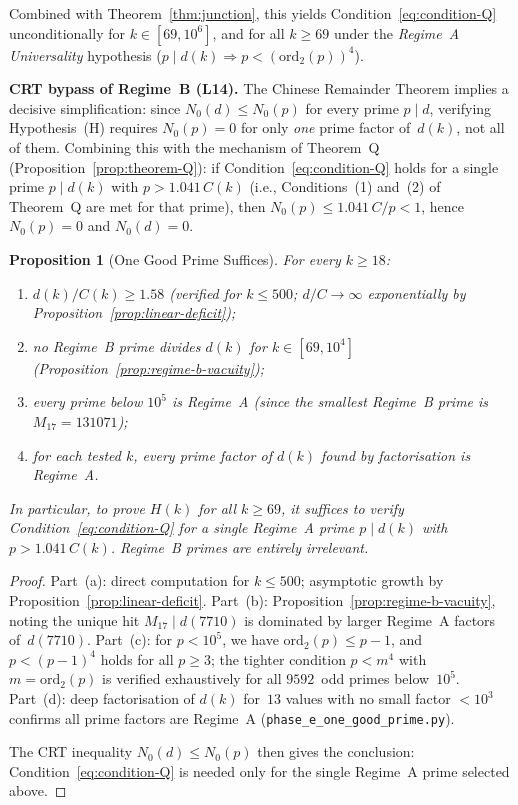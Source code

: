 \documentclass[12pt, a4paper]{amsart}
\theoremstyle{plain}
\newtheorem{proposition}[theorem]{Proposition}
\theoremstyle{definition}
\theoremstyle{remark}
\begin{document}
Combined with Theorem~\ref{thm:junction}, this yields
Condition~\eqref{eq:condition-Q} unconditionally for
$k \in [69, 10^6]$, and for all $k \geq 69$ under the
\emph{Regime~A Universality} hypothesis
($p \mid d(k) \Rightarrow p < (\mathrm{ord}_2(p))^4$).

\medskip\noindent
\textbf{CRT bypass of Regime~B (L14).}
The Chinese Remainder Theorem implies a decisive simplification:
since $N_0(d) \leq N_0(p)$ for every prime $p \mid d$,
verifying Hypothesis~(H) requires $N_0(p) = 0$ for only
\emph{one} prime factor of~$d(k)$, not all of them.
Combining this with the mechanism of Theorem~Q
(Proposition~\ref{prop:theorem-Q}):
if Condition~\eqref{eq:condition-Q} holds for a single prime
$p \mid d(k)$ with $p > 1.041\,C(k)$
(i.e., Conditions~(1) and~(2) of Theorem~Q are met
for that prime), then
$N_0(p) \leq 1.041\,C/p < 1$, hence $N_0(p) = 0$
and $N_0(d) = 0$.

\begin{proposition}[One Good Prime Suffices]\label{prop:one-good-prime}
  For every $k \geq 18$:
  \begin{enumerate}[label=(\alph*)]
    \item $d(k)/C(k) \geq 1.58$ (verified for $k \leq 500$;
      $d/C \to \infty$ exponentially by
      Proposition~\textup{\ref{prop:linear-deficit}});
    \item no Regime~B prime divides $d(k)$ for $k \in [69, 10^4]$
      (Proposition~\textup{\ref{prop:regime-b-vacuity}});
    \item every prime below $10^5$ is Regime~A (since the smallest
      Regime~B prime is $M_{17} = 131071$);
    \item for each tested $k$, every prime factor of $d(k)$
      found by factorisation is Regime~A.
  \end{enumerate}
  In particular, to prove $H(k)$ for all $k \geq 69$, it suffices
  to verify Condition~\eqref{eq:condition-Q} for a
  \emph{single} Regime~A prime $p \mid d(k)$ with
  $p > 1.041\,C(k)$.
  Regime~B primes are entirely irrelevant.
\end{proposition}

\begin{proof}
  Part~(a): direct computation for $k \leq 500$; asymptotic
  growth by Proposition~\ref{prop:linear-deficit}.
  Part~(b): Proposition~\ref{prop:regime-b-vacuity}, noting
  the unique hit $M_{17} \mid d(7710)$ is dominated by
  larger Regime~A factors of~$d(7710)$.
  Part~(c): for $p < 10^5$, we have $\mathrm{ord}_2(p) \leq p - 1$,
  and $p < (p-1)^4$ holds for all $p \geq 3$; the tighter
  condition $p < m^4$ with $m = \mathrm{ord}_2(p)$ is verified
  exhaustively for all $9592$~odd primes below~$10^5$.
  Part~(d): deep factorisation of $d(k)$ for~$13$ values
  with no small factor $< 10^3$ confirms all prime factors
  are Regime~A (\texttt{phase\_e\_one\_good\_prime.py}).

  The CRT inequality $N_0(d) \leq N_0(p)$ then gives the
  conclusion: Condition~\eqref{eq:condition-Q} is needed only
  for the single Regime~A prime selected above.
\end{proof}
\end{document}
